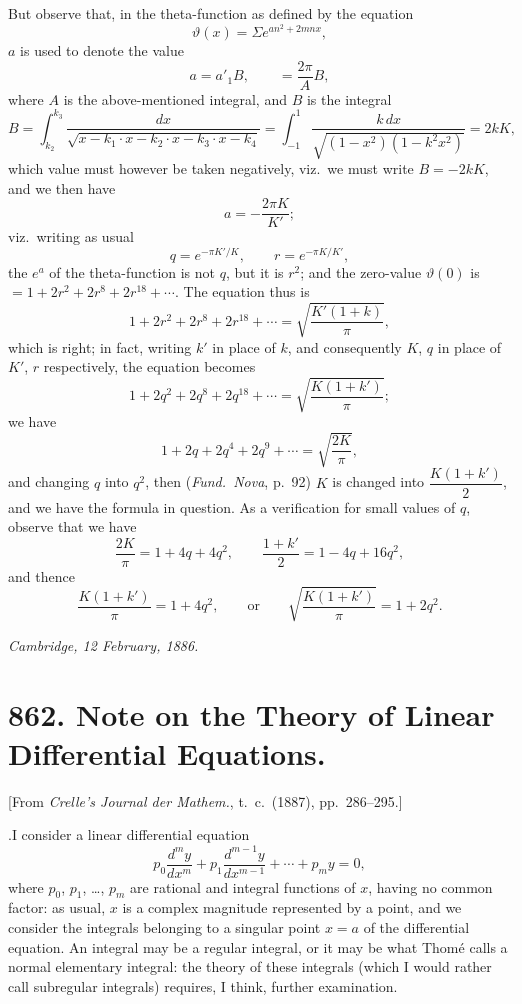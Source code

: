 \documentclass[11pt]{article}
\begin{document}
But observe that, in the theta-function as defined by the equation
\[
\vartheta(x) = \Sigma e^{a n^{2}+2mnx},
\]
$a$ is used to denote the value
\[
a = a'_{1}B,\qquad = \frac{2\pi}{A}B,
\]
where $A$ is the above-mentioned integral, and $B$ is the integral
\[
B = \int_{k_{2}}^{k_{3}} \frac{dx}{\sqrt{x-k_{1}\cdot x-k_{2}\cdot x-k_{3}\cdot x-k_{4}}}
= \int_{-1}^{1} \frac{k\,dx}{\sqrt{(1-x^{2})(1-k^{2}x^{2})}}
= 2kK,
\]
which value must however be taken negatively, viz.\ we must write $B = -2kK$, and we then have
\[
a = -\frac{2\pi K}{K'};
\]
viz.\ writing as usual
\[
q=e^{-\pi K'/K},\qquad r=e^{-\pi K/K'},
\]
the $e^{a}$ of the theta-function is not $q$, but it is $r^{2}$; and the zero-value $\vartheta(0)$ is
$=1+2r^{2}+2r^{8}+2r^{18}+\cdots$. The equation thus is
\[
1+2r^{2}+2r^{8}+2r^{18}+\cdots
= \sqrt{\frac{K'(1+k)}{\pi}},
\]
which is right; in fact, writing $k'$ in place of $k$, and consequently $K$, $q$ in place of $K'$, $r$ respectively, the equation becomes
\[
1+2q^{2}+2q^{8}+2q^{18}+\cdots
= \sqrt{\frac{K(1+k')}{\pi}};
\]
we have
\[
1+2q+2q^{4}+2q^{9}+\cdots
= \sqrt{\frac{2K}{\pi}},
\]
and changing $q$ into $q^{2}$, then (\textit{Fund.\ Nova}, p.~92) $K$ is changed into $\dfrac{K(1+k')}{2}$, and we have the formula in question. As a verification for small values of $q$, observe that we have
\[
\frac{2K}{\pi}=1+4q+4q^{2},\qquad \frac{1+k'}{2}=1-4q+16q^{2},
\]
and thence
\[
\frac{K(1+k')}{\pi}=1+4q^{2},
\qquad\text{or}\qquad
\sqrt{\frac{K(1+k')}{\pi}}=1+2q^{2}.
\]

\medskip

\begin{flushright}\textit{Cambridge, 12 February, 1886.}\end{flushright}

\vfill
\newpage

\section*{862. Note on the Theory of Linear Differential Equations.}

\begin{flushright}\small
[From \textit{Crelle's Journal der Mathem.}, t.~c.\ (1887), pp.~286--295.]
\end{flushright}

\medskip

.\quad I consider a linear differential equation
\[
p_{0}\frac{d^{m}y}{dx^{m}} + p_{1}\frac{d^{m-1}y}{dx^{m-1}} + \cdots + p_{m}y = 0,
\]
where $p_{0}$, $p_{1}$, \ldots, $p_{m}$ are rational and integral functions of $x$, having no common factor: as usual, $x$ is a complex magnitude represented by a point, and we consider the integrals belonging to a singular point $x = a$ of the differential equation. An integral may be a regular integral, or it may be what Thom\'e calls a normal elementary integral: the theory of these integrals (which I would rather call subregular integrals) requires, I think, further examination.
\end{document}
